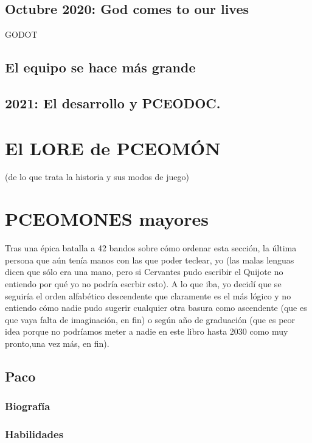 \documentclass[letterpaper]{article}
\begin{document}
\subsection{Octubre 2020: God comes to our lives}

GODOT

\subsection{El equipo se hace más grande}

\subsection{2021: El desarrollo y PCEODOC.}

\section{El LORE de PCEOMÓN}
(de lo que trata la historia y sus modos de juego)

\section{PCEOMONES mayores}
Tras una épica batalla a 42 bandos sobre cómo ordenar esta sección, la última persona que aún tenía manos con las que poder teclear, yo (las malas lenguas dicen que
sólo era una mano, pero si Cervantes pudo escribir el Quijote no entiendo por qué yo no podría escrbir esto). A lo que iba, yo decidí que se seguiría el orden
alfabético descendente que claramente es el más lógico y no entiendo cómo nadie pudo sugerir cualquier otra basura como ascendente (que es que vaya falta de
imaginación, en fin) o según año de graduación (que es peor idea porque no podríamos meter a nadie en este libro hasta 2030 como muy pronto,una vez más, en fin).
\subsection{Paco}

\subsubsection{Biografía}

\subsubsection{Habilidades}
\end{document}
